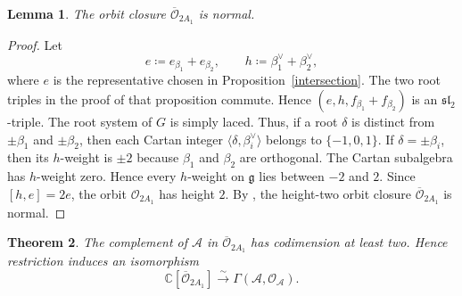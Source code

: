 \documentclass[12pt]{article}
\newtheorem{theorem}{Theorem}[section]
\newtheorem{lemma}[theorem]{Lemma}
\theoremstyle{definition}
\begin{document}
\begin{lemma}\label{normality}
The orbit closure \(\overline{\mathcal O}_{2A_1}\) is normal.
\end{lemma}

\begin{proof}
Let
\[
    e\coloneqq e_{\beta_1}+e_{\beta_2},
    \qquad
    h\coloneqq\beta_1^\vee+\beta_2^\vee,
\]
where \(e\) is the representative chosen in
Proposition~\ref{intersection}. The two root triples in the proof of that
proposition commute. Hence
\((e,h,f_{\beta_1}+f_{\beta_2})\) is an \(\mathfrak{sl}_2\)-triple. The
root system of \(G\) is simply laced. Thus, if a root \(\delta\) is distinct
from \(\pm\beta_1\) and \(\pm\beta_2\), then
each Cartan integer \(\langle\delta,\beta_i^\vee\rangle\) belongs to
\(\{-1,0,1\}\). If \(\delta=\pm\beta_i\), then its \(h\)-weight is
\(\pm2\) because \(\beta_1\) and \(\beta_2\) are orthogonal. The Cartan
subalgebra has \(h\)-weight zero. Hence every \(h\)-weight on
\(\mathfrak g\) lies between \(-2\) and \(2\). Since \([h,e]=2e\),
the orbit \(\mathcal O_{2A_1}\) has height \(2\).
By \cite[Proposition~4.1.1]{BenderPerrin}, the height-two orbit closure
\(\overline{\mathcal O}_{2A_1}\) is normal.
\end{proof}

\begin{theorem}\label{boundary-in-closure}
The complement of \(\mathcal A\) in \(\overline{\mathcal O}_{2A_1}\) has
codimension at least two. Hence restriction induces an isomorphism
\[
    \mathbb C[\overline{\mathcal O}_{2A_1}]\xrightarrow{\sim}
    \Gamma(\mathcal A,\mathcal O_{\mathcal A}).
\]
\end{theorem}
\end{document}
